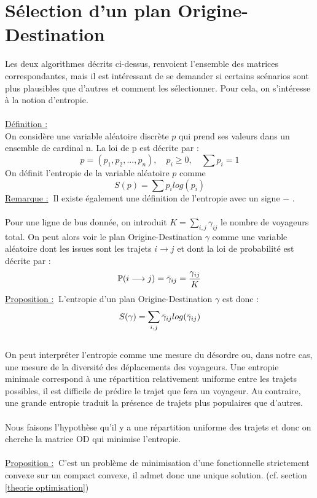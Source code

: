 \documentclass[12pt]{article}
\newcommand{\defin}{\underline{Définition :}}
\newcommand{\rmq}{\underline{Remarque :}}
\newcommand{\prop}{\underline{Proposition :}}
\begin{document}
\section{Sélection d'un plan Origine-Destination}
Les deux algorithmes décrits ci-dessus, renvoient l'ensemble des matrices correspondantes, mais il est intéressant de se demander si certains scénarios sont plus plausibles que d'autres et comment les sélectionner. Pour cela, on s'intéresse à la notion d'entropie.\\
\\
\defin\\
On considère une variable aléatoire discrète $p$ qui prend ses valeurs dans un ensemble de cardinal n. La loi de p est décrite par :
\[p = (p_1,p_2,...,p_n),\quad p_i \geq 0,\quad \sum p_i = 1\]
On définit l'entropie de la variable aléatoire $p$ comme
\[S(p) = \sum p_i log(p_i)\]
\rmq $\:$
Il existe également une définition de l'entropie avec un signe $-$ .\\
\\
Pour une ligne de bus donnée, on introduit $K = \sum_{i,j} \gamma_{ij} $ le nombre de voyageurs total. On peut alors voir le plan Origine-Destination $\gamma$ comme une variable aléatoire dont les issues sont les trajets $i \longrightarrow j$ et dont la loi de probabilité est décrite par :
\[
\mathbb{P}(i \longrightarrow j) = \Bar{\gamma}_{ij} = \frac{\gamma_{ij}}{K}
\]
\prop $\:$ L'entropie d'un plan Origine-Destination $\gamma$ est donc :
\[S(\gamma) = \sum_{i,j}\Bar{\gamma}_{ij}log(\Bar{\gamma}_{ij})
\]
\\
On peut interpréter l'entropie comme une mesure du désordre ou, dans notre cas, une mesure de la diversité des déplacements des voyageurs. Une entropie minimale correspond à une répartition relativement uniforme entre les trajets possibles, il est difficile de prédire le trajet que fera un voyageur. Au contraire, une grande entropie traduit la présence de trajets plus populaires que d'autres.\\
\\
Nous faisons l'hypothèse qu'il y a une répartition uniforme des trajets et donc on cherche la matrice OD qui minimise l'entropie.\\
 \\
\prop$\:$ C'est un problème de minimisation d'une fonctionnelle strictement convexe sur un compact convexe, il admet donc une unique solution. (cf. section \ref{theorie optimisation})
\end{document}
